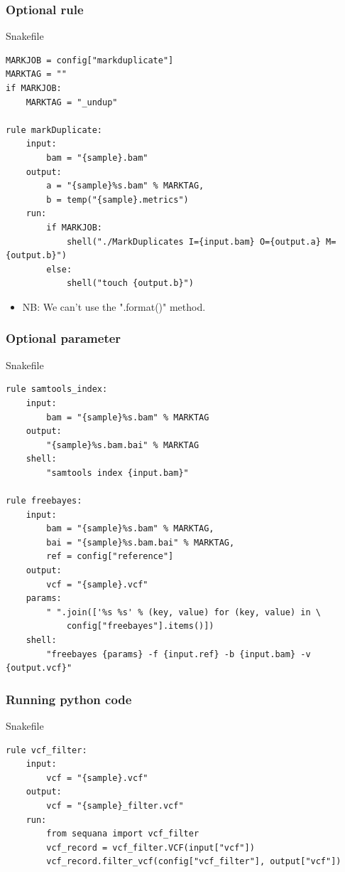 \documentclass{beamer}
\begin{document}
\begin{frame}[fragile]
    \frametitle{Optional rule}
    \begin{block}{Snakefile}
        \begin{lstlisting}
MARKJOB = config["markduplicate"]
MARKTAG = ""
if MARKJOB:
    MARKTAG = "_undup"

rule markDuplicate:
    input:
        bam = "{sample}.bam"
    output:
        a = "{sample}%s.bam" % MARKTAG,
        b = temp("{sample}.metrics")
    run:
        if MARKJOB:
            shell("./MarkDuplicates I={input.bam} O={output.a} M={output.b}")
        else:
            shell("touch {output.b}")
        \end{lstlisting}
    \end{block}
    \begin{itemize}
        \item NB: We can't use the ".format()" method.
    \end{itemize}
\end{frame}

\begin{frame}[fragile]
    \frametitle{Optional parameter}
    \begin{block}{Snakefile}
        \begin{lstlisting}
rule samtools_index:
    input: 
        bam = "{sample}%s.bam" % MARKTAG
    output:
        "{sample}%s.bam.bai" % MARKTAG
    shell:
        "samtools index {input.bam}"

rule freebayes:
    input:
        bam = "{sample}%s.bam" % MARKTAG,
        bai = "{sample}%s.bam.bai" % MARKTAG,
        ref = config["reference"]
    output:
        vcf = "{sample}.vcf"
    params:
        " ".join(['%s %s' % (key, value) for (key, value) in \
            config["freebayes"].items()])
    shell:
        "freebayes {params} -f {input.ref} -b {input.bam} -v {output.vcf}"
        \end{lstlisting}
    \end{block}
\end{frame}

\begin{frame}[fragile]
    \frametitle{Running python code}
    \begin{block}{Snakefile}
        \begin{lstlisting}
rule vcf_filter:
    input:
        vcf = "{sample}.vcf"
    output:
        vcf = "{sample}_filter.vcf"
    run:
        from sequana import vcf_filter
        vcf_record = vcf_filter.VCF(input["vcf"])
        vcf_record.filter_vcf(config["vcf_filter"], output["vcf"])
        \end{lstlisting}
    \end{block}
\end{frame}
\end{document}
